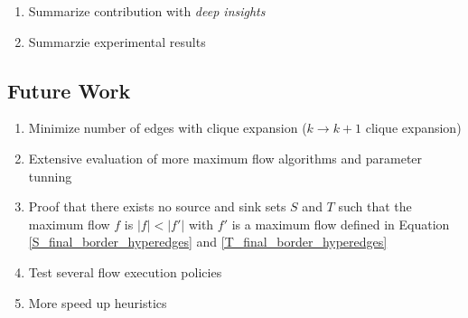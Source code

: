 \begin{enumerate}
\item Summarize contribution with \emph{deep insights}
\item Summarzie experimental results
 \end{enumerate}

 \subsection{Future Work}

 \begin{enumerate}
\item Minimize number of edges with clique expansion ($k \rightarrow k + 1$ clique
      expansion)
\item Extensive evaluation of more maximum flow algorithms and parameter tunning
\item Proof that there exists no source and sink sets $S$ and $T$ such that the maximum
      flow $f$ is $|f| < |f'|$ with $f'$ is a maximum flow defined in Equation \ref{S_final_border_hyperedges}
      and \ref{T_final_border_hyperedges}
\item Test several flow execution policies
\item More speed up heuristics
 \end{enumerate}